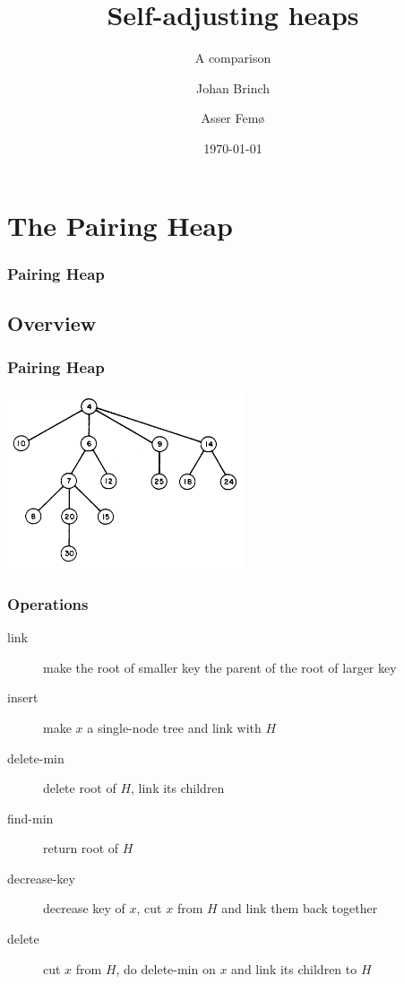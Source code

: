 \documentclass{beamer}
\title{Self-adjusting heaps}
\subtitle{A comparison}
\author{Johan Brinch \and Asser Femø}
\date{\today}
\begin{document}
\lstset{basicstyle=\footnotesize\ttfamily}
\begin{frame}
  \titlepage
\end{frame}

\section{The Pairing Heap}

\begin{frame}[fragile]
\frametitle{Pairing Heap}
\tableofcontents
\end{frame}

\subsection{Overview}
\begin{frame}[fragile]
\frametitle{Pairing Heap}

\begin{center}
\includegraphics[width=7cm]{../pairing-heap-slides/fig1.png}
\end{center}

\end{frame}

\begin{frame}
\frametitle{Operations}

\begin{description}
\item[link] make the root of smaller key the parent of the root of larger key
\item[insert] make $x$ a single-node tree and link with $H$
\item[delete-min] delete root of $H$, link its children
\item[find-min] return root of $H$
\item[decrease-key] decrease key of $x$, cut $x$ from $H$ and link them
back together
\item[delete] cut $x$ from $H$, do delete-min on $x$ and link its children to $H$
\end{description}

\end{frame}
\end{document}

